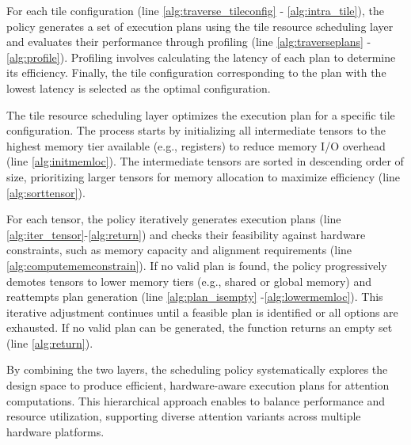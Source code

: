 For each tile configuration (line \ref{alg:traverse_tileconfig} - \ref{alg:intra_tile}), the policy generates a set of execution plans using the tile resource scheduling layer and evaluates their performance through profiling (line \ref{alg:traverseplans} -\ref{alg:profile}). Profiling involves calculating the latency of each plan to determine its efficiency. Finally, the tile configuration corresponding to the plan with the lowest latency is selected as the optimal configuration. 

The tile resource scheduling layer optimizes the execution plan for a specific tile configuration. The process starts by initializing all intermediate tensors to the highest memory tier available (e.g., registers) to reduce memory I/O overhead (line \ref{alg:initmemloc}). The intermediate tensors are sorted in descending order of size, prioritizing larger tensors for memory allocation to maximize efficiency (line \ref{alg:sorttensor}).

For each tensor, the policy iteratively generates execution plans (line \ref{alg:iter_tensor}-\ref{alg:return}) and checks their feasibility against hardware constraints, such as memory capacity and alignment requirements (line \ref{alg:computememconstrain}). If no valid plan is found, the policy progressively demotes tensors to lower memory tiers (e.g., shared or global memory) and reattempts plan generation (line \ref{alg:plan_isempty} -\ref{alg:lowermemloc}). This iterative adjustment continues until a feasible plan is identified or all options are exhausted. If no valid plan can be generated, the function returns an empty set (line \ref{alg:return}).

By combining the two layers, the scheduling policy systematically explores the design space to produce efficient, hardware-aware execution plans for attention computations. This hierarchical approach enables \oursys{} to balance performance and resource utilization, supporting diverse attention variants across multiple hardware platforms.





